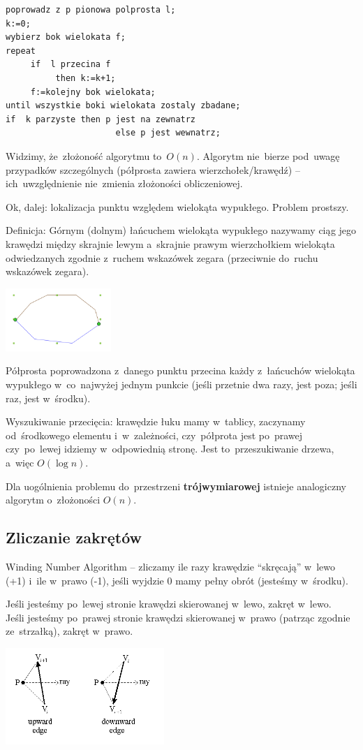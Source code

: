 \begin{lstlisting}
poprowadz z p pionowa polprosta l;
k:=0; 
wybierz bok wielokata f;
repeat
     if  l przecina f
          then k:=k+1;
     f:=kolejny bok wielokata;
until wszystkie boki wielokata zostaly zbadane; 
if  k parzyste then p jest na zewnatrz
                      else p jest wewnatrz;
\end{lstlisting}

Widzimy, że~złożoność algorytmu to~$O(n)$. Algorytm nie~bierze pod~uwagę przypadków szczególnych (półprosta zawiera wierzchołek/krawędź) -- ich~uwzględnienie nie~zmienia złożoności obliczeniowej.

Ok, dalej: lokalizacja punktu względem wielokąta wypukłego. Problem prostszy.

Definicja: Górnym (dolnym) łańcuchem wielokąta wypukłego nazywamy ciąg jego krawędzi między skrajnie lewym a~skrajnie prawym wierzchołkiem wielokąta odwiedzanych zgodnie z~ruchem wskazówek zegara (przeciwnie do~ruchu wskazówek zegara).
\begin{center}
 \includegraphics[width=4cm]{lancuch}
\end{center}

Półprosta poprowadzona z~danego punktu przecina każdy z~łańcuchów wielokąta wypukłego w~co~najwyżej jednym punkcie (jeśli przetnie dwa razy, jest poza; jeśli raz, jest w~środku).

Wyszukiwanie przecięcia:
krawędzie łuku mamy w~tablicy, zaczynamy od~środkowego elementu i~w~zależności, czy~półprota jest po~prawej czy~po~lewej idziemy w~odpowiednią stronę. Jest to~przeszukiwanie drzewa, a~więc $O(\log n)$.

Dla uogólnienia problemu do~przestrzeni \textbf{trójwymiarowej} istnieje analogiczny algorytm o~złożoności $O(n)$.

\subsection{Zliczanie zakrętów}
Winding Number Algorithm -- zliczamy ile razy krawędzie ``skręcają'' w~lewo (+1) i~ile w~prawo (-1), jeśli wyjdzie 0 mamy pełny obrót (jesteśmy w~środku).

Jeśli jesteśmy po~lewej stronie krawędzi skierowanej w~lewo, zakręt w~lewo.\\
Jeśli jesteśmy po~prawej stronie krawędzi skierowanej w~prawo (patrząc zgodnie ze~strzałką), zakręt w~prawo.
\begin{center}
 \includegraphics[width=6cm]{uede}
\end{center}

